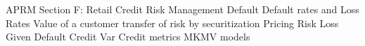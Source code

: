 APRM Section F: Retail Credit Risk Management
Default Default rates and Loss Rates
Value of a customer
transfer of risk by securitization
Pricing Risk
Loss Given Default
Credit Var
Credit metrics
MKMV models
